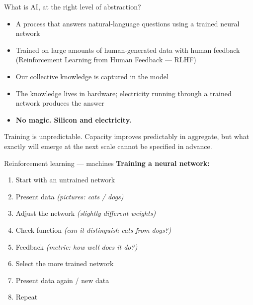 \documentclass[aspectratio=169]{beamer}
\begin{document}
\begin{frame}{What is AI, at the right level of abstraction?}
  \begin{itemize}
    \item A process that answers natural-language questions using a trained
          neural network
    \item Trained on large amounts of human-generated data with human feedback
          (Reinforcement Learning from Human Feedback --- RLHF)
    \item Our collective knowledge is captured in the model
    \item The knowledge lives in hardware; electricity running through a trained
          network produces the answer
    \item \textbf{No magic. Silicon and electricity.}
  \end{itemize}
  \vspace{0.5em}
  \alert{Training is unpredictable.} Capacity improves predictably in aggregate,
  but what exactly will emerge at the next scale cannot be specified in advance.
\end{frame}

\begin{frame}{Reinforcement learning --- machines}
  \textbf{Training a neural network:}
  \begin{enumerate}
    \item Start with an untrained network
    \item Present data \hfill \textit{(pictures: cats / dogs)}
    \item Adjust the network \hfill \textit{(slightly different weights)}
    \item Check function \hfill \textit{(can it distinguish cats from dogs?)}
    \item Feedback \hfill \textit{(metric: how well does it do?)}
    \item Select the more trained network
    \item Present data again / new data
    \item Repeat
  \end{enumerate}
\end{frame}
\end{document}
